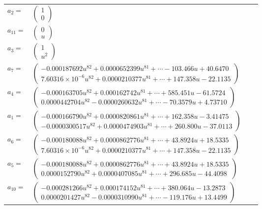 \documentclass[1p]{elsarticle_modified}
\theoremstyle{definition}
\begin{document}
\begin{tabular}{m{7pt} m{180pt} m{7pt} m{180pt} }
\flushright $a_{2}=$&$\begin{pmatrix}1\\0\end{pmatrix}$ \\
\flushright $a_{11}=$&$\begin{pmatrix}0\\u\end{pmatrix}$ \\
\flushright $a_{3}=$&$\begin{pmatrix}1\\u^2\end{pmatrix}$ \\
\flushright $a_{7}=$&$\begin{pmatrix}-0.000187692 u^{82}+0.0000652399 u^{81}+\cdots-103.466 u+40.6470\\7.60316\times10^{-6} u^{82}+0.0000210377 u^{81}+\cdots+147.358 u-22.1135\end{pmatrix}$ \\
\flushright $a_{4}=$&$\begin{pmatrix}-0.000163705 u^{82}+0.000162742 u^{81}+\cdots+585.451 u-61.5724\\0.0000442704 u^{82}-0.0000260632 u^{81}+\cdots-70.3579 u+4.73710\end{pmatrix}$ \\
\flushright $a_{1}=$&$\begin{pmatrix}-0.000166790 u^{82}+0.0000820861 u^{81}+\cdots+162.358 u-3.41475\\-0.0000300517 u^{82}+0.0000474903 u^{81}+\cdots+260.800 u-37.0113\end{pmatrix}$ \\
\flushright $a_{6}=$&$\begin{pmatrix}-0.000180088 u^{82}+0.0000862776 u^{81}+\cdots+43.8924 u+18.5335\\7.60316\times10^{-6} u^{82}+0.0000210377 u^{81}+\cdots+147.358 u-22.1135\end{pmatrix}$ \\
\flushright $a_{5}=$&$\begin{pmatrix}-0.000180088 u^{82}+0.0000862776 u^{81}+\cdots+43.8924 u+18.5335\\0.0000152790 u^{82}+0.0000407085 u^{81}+\cdots+296.685 u-44.4098\end{pmatrix}$ \\
\flushright $a_{10}=$&$\begin{pmatrix}-0.000281266 u^{82}+0.000174152 u^{81}+\cdots+380.064 u-13.2873\\0.0000201427 u^{82}-0.0000310990 u^{81}+\cdots-119.176 u+13.4499\end{pmatrix}$ \\

\end{tabular}
\end{document}
